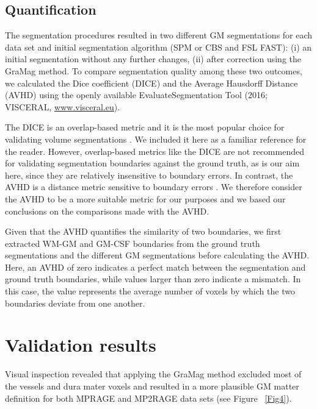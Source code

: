 \subsection{Quantification}
The segmentation procedures resulted in two different GM segmentations for each data set and initial segmentation algorithm (SPM or CBS and FSL FAST): (i) an initial segmentation without any further changes, (ii) after correction using the GraMag method. To compare segmentation quality among these two outcomes, we calculated the Dice coefficient (DICE) and the Average Hausdorff Distance (AVHD) using the openly available EvaluateSegmentation Tool (2016; VISCERAL, \href{http://www.visceral.eu}{www.visceral.eu}).

The DICE is an overlap-based metric and it is the most popular choice for validating volume segmentations \parencite{Taha2015}. We included it here as a familiar reference for the reader. However, overlap-based metrics like the DICE are not recommended for validating segmentation boundaries against the ground truth, as is our aim here, since they are relatively insensitive to boundary errors. In contrast, the AVHD is a distance metric sensitive to boundary errors \parencite{Taha2015}. We therefore consider the AVHD to be a more suitable metric for our purposes and we based our conclusions on the comparisons made with the AVHD. 

Given that the AVHD quantifies the similarity of two boundaries, we first extracted WM-GM and GM-CSF boundaries from the ground truth segmentations and the different GM segmentations before calculating the AVHD. Here, an AVHD of zero indicates a perfect match between the segmentation and ground truth boundaries, while values larger than zero indicate a mismatch. In this case, the value represents the average number of voxels by which the two boundaries deviate from one another.

\section{Validation results} \label{ValidationResults}
Visual inspection revealed that applying the GraMag method excluded most of the vessels and dura mater voxels and resulted in a more plausible GM matter definition for both MPRAGE and MP2RAGE data sets (see Figure ~\ref{Fig4}).

